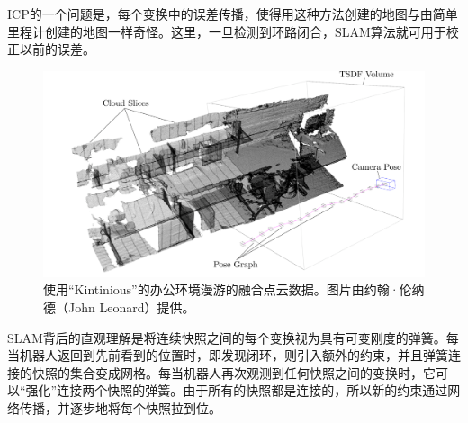 
ICP的一个问题是，每个变换中的误差传播，使得用这种方法创建的地图与由简单里程计创建的地图一样奇怪。这里，一旦检测到环路闭合，SLAM算法就可用于校正以前的误差。

\begin{figure}
\centering
\includegraphics[width=\textwidth]{figs/kintinous}
\caption{使用“Kintinious”的办公环境漫游的融合点云数据。图片由约翰·伦纳德（John Leonard）提供。}
\label{fig:kintinous}
\end{figure}


SLAM背后的直观理解是将连续快照之间的每个变换视为具有可变刚度的弹簧。每当机器人返回到先前看到的位置时，即发现闭环，则引入额外的约束，并且弹簧连接的快照的集合变成网格。每当机器人再次观测到任何快照之间的变换时，它可以“强化”连接两个快照的弹簧。由于所有的快照都是连接的，所以新的约束通过网络传播，并逐步地将每个快照拉到位。

